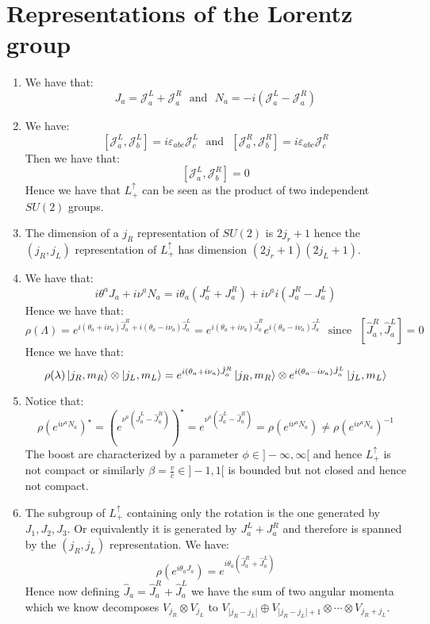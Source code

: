 \documentclass[10pt,a4paper]{book}
\begin{document}
\chapter{Representations of the Lorentz group}

\begin{enumerate}

\item We have that:
\[
J_a = \mathcal{J}_a^L + \mathcal{J}_a^R \mbox{~~and~~} N_a = -i(\mathcal{J}_a^L - \mathcal{J}_a^R)
\]

\item We have:
\[
[\mathcal{J}_a^L, \mathcal{J}_b^L] = i \varepsilon_{abc} \mathcal{J}_c^L \mbox{~~and~~} 
[\mathcal{J}_a^R, \mathcal{J}_b^R] = i \varepsilon_{abc} \mathcal{J}_c^R
\]
Then we have that:
\[
[\mathcal{J}_a^L, \mathcal{J}_b^R] = 0
\]
Hence we have that $L_+^\uparrow$ can be seen as the product of two independent $SU(2)$ groups.

\item The dimension of a $j_R$ representation of $SU(2)$ is $2j_r + 1$ hence the $(j_R, j_L)$ representation of $L_+^\uparrow$ has dimension $(2j_r + 1)(2j_L + 1)$. 

\item We have that:
\[
i \theta^a J_a + i \nu^a N_a = i \theta_a (J_a^L + J_a^R) + i \nu^a i (J_a^R - J_a^L)
\]
Hence we have that:
\[
\rho(\Lambda) = e^{i(\theta_a + i \nu_a) \hat{J}_a^R + i(\theta_a - i \nu_a) \hat{J}_a^L} =  e^{i(\theta_a + i \nu_a) \hat{J}_a^R}  e^{i(\theta_a - i \nu_a) \hat{J}_a^L} \mbox{~~since~~} [\hat{J}_a^R, \hat{J}_a^L] = 0
\]
Hence we have that:
\[
\rho(\lambda) \ket{j_R, m_R} \otimes \ket{j_L, m_L} = e^{i(\theta_a + i \nu_a) \hat{J}_a^R} \ket{j_R, m_R} \otimes  e^{i(\theta_a - i \nu_a) \hat{J}_a^L} \ket{j_L, m_L}
\]

\item Notice that:
\[
\rho(e^{i \nu^a N_a})^\star = \left( e^{\nu^a(\hat{J}_a^L - \hat{J}_a^R)} \right)^\star = e^{\nu^a(\hat{J}_a^L - \hat{J}_a^R)} = \rho(e^{i \nu^a N_a}) \neq \rho(e^{i \nu^a N_a})^{-1}
\]
The boost are characterized by a parameter $\phi \in ]-\infty, \infty[$ and hence $L_+^\uparrow$ is not compact or similarly $\beta = \frac{v}{c} \in ]-1, 1[$ is bounded but not closed and hence not compact. 

\item The subgroup of $L_+^\uparrow$ containing only the rotation is the one generated by $J_1, J_2, J_3$. Or equivalently it is generated by $J_a^L + J_a^R$ and therefore is spanned by the $(j_R, j_L)$ representation. We have:
\[
\rho(e^{i \theta_a J_a}) = e^{i \theta_a (\hat{J}_a^R + \hat{J}_a^L)}
\]
Hence now defining $\hat{J}_a = \hat{J}_a^R + \hat{J}_a^L$ we have the sum of two angular momenta which we know decomposes $V_{j_R} \otimes V_{j_L}$ to $V_{|j_R - j_L|} \oplus V_{|j_R - j_L| + 1} \otimes \cdots \otimes V_{j_R + j_L}$. 


\end{enumerate}
\end{document}
